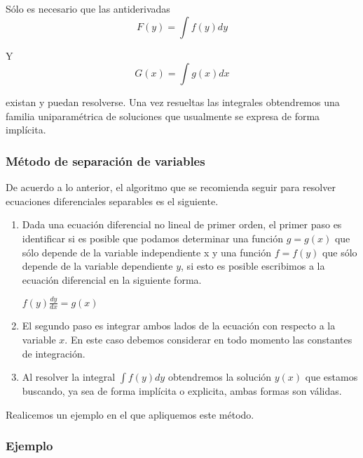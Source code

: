 \documentclass[l etterpaper,11pt]{article}
\begin{document}
Sólo es necesario que las antiderivadas
\begin{equation}
F(y)=\int f(y)dy
\end{equation}

Y
\begin{equation}
G(x)=\int g(x)dx
\end{equation}

existan y puedan resolverse. Una vez resueltas las integrales obtendremos una familia uniparamétrica de soluciones que usualmente se expresa de forma implícita.



\subsubsection{Método de separación de variables}

De acuerdo a lo anterior, el algoritmo que se recomienda seguir para resolver ecuaciones diferenciales separables es el siguiente.
\begin{enumerate}
\item  Dada una ecuación diferencial no lineal de primer orden, el primer paso es identificar si es posible que podamos determinar una función $g=g(x)$ que sólo depende de la variable independiente x y una función $f=f(y)$ que sólo depende de la variable dependiente $y$, si esto es posible escribimos a la ecuación diferencial en la siguiente forma.
\begin {center}
$f(y)\frac{dy}{dx}=g(x)$\\
\end {center}

\item  El segundo paso es integrar ambos lados de la ecuación con respecto a la variable $x$. En este caso debemos considerar en todo momento las constantes de integración.
\item  Al resolver la integral $\int f(y)dy$ obtendremos la solución $y(x)$ que estamos buscando, ya sea de forma implícita o explicita, ambas formas son válidas.
\end{enumerate}

Realicemos un ejemplo en el que apliquemos este método.

\subsubsection{Ejemplo}
\end{document}
